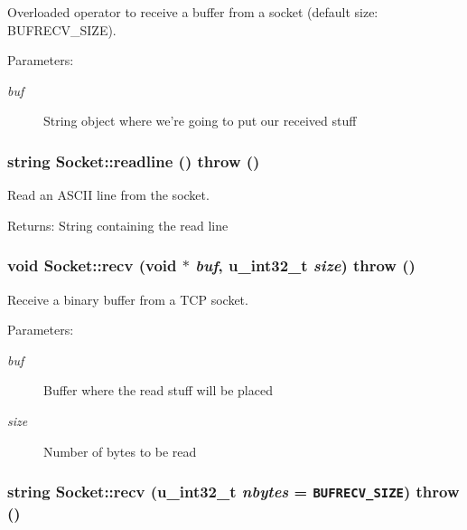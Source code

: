 Overloaded operator to receive a buffer from a socket (default size: BUFRECV\_\-SIZE). 

\begin{Desc}
\item[Parameters:]
\begin{description}
\item[{\em buf}]String object where we're going to put our received stuff \end{description}
\end{Desc}
\hypertarget{classSocket_2e44502bb59aa3d338436e830c14fe27}{
\subsubsection[{readline}]{\setlength{\rightskip}{0pt plus 5cm}string Socket::readline ()  throw ()}}
\label{classSocket_2e44502bb59aa3d338436e830c14fe27}


Read an ASCII line from the socket. 

\begin{Desc}
\item[Returns:]String containing the read line \end{Desc}
\hypertarget{classSocket_21a85ab2cc66b4e6f399c6b119f8263d}{
\subsubsection[{recv}]{\setlength{\rightskip}{0pt plus 5cm}void Socket::recv (void $\ast$ {\em buf}, \/  u\_\-int32\_\-t {\em size})  throw ()}}
\label{classSocket_21a85ab2cc66b4e6f399c6b119f8263d}


Receive a binary buffer from a TCP socket. 

\begin{Desc}
\item[Parameters:]
\begin{description}
\item[{\em buf}]Buffer where the read stuff will be placed \item[{\em size}]Number of bytes to be read \end{description}
\end{Desc}
\hypertarget{classSocket_58b58a3abc4914cfce721f7389327241}{
\subsubsection[{recv}]{\setlength{\rightskip}{0pt plus 5cm}string Socket::recv (u\_\-int32\_\-t {\em nbytes} = {\tt BUFRECV\_\-SIZE})  throw ()}}
\label{classSocket_58b58a3abc4914cfce721f7389327241}


